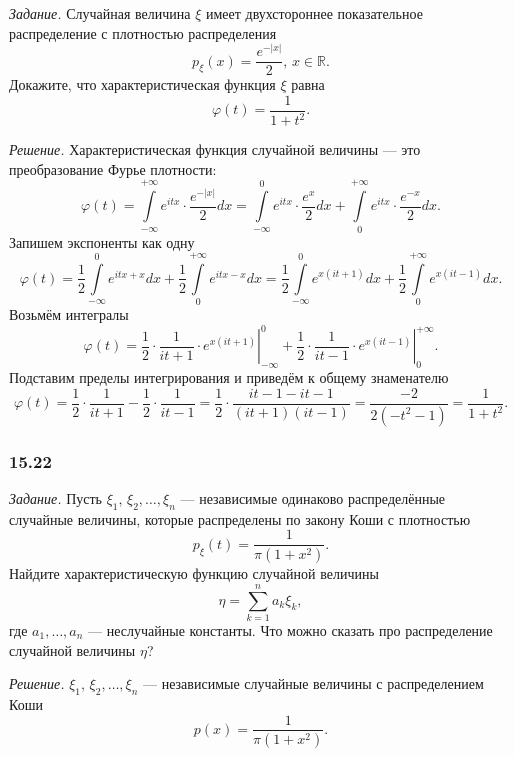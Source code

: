 \textit{Задание.}
Случайная величина $ \xi $
имеет двухстороннее показательное распределение с плотностью распределения
$$p_{ \xi } \left( x \right) =
  \frac{e^{- \left| x \right| }}{2}, \,
  x \in \mathbb{R}.$$
Докажите, что характеристическая функция $ \xi $ равна
$$ \varphi \left( t \right) =
  \frac{1}{1 + t^2}.$$

\textit{Решение.} Характеристическая функция случайной величины --- это преобразование Фурье плотности:
$$ \varphi \left( t \right) =
  \int \limits_{- \infty }^{+ \infty } e^{itx} \cdot \frac{e^{- \left| x \right| }}{2} dx =
  \int \limits_{- \infty }^0 e^{itx} \cdot \frac{e^x}{2} dx +
  \int \limits_0^{+ \infty } e^{itx} \cdot \frac{e^{- x}}{2} dx.$$
Запишем экспоненты как одну
$$ \varphi \left( t \right) =
  \frac{1}{2} \int \limits_{- \infty }^0 e^{itx + x} dx +
  \frac{1}{2} \int \limits_0^{+ \infty } e^{itx - x} dx =
  \frac{1}{2} \int \limits_{- \infty }^0 e^{x \left( it + 1 \right) } dx +
  \frac{1}{2} \int \limits_0^{+ \infty } e^{x \left( it - 1 \right) }dx.$$
Возьмём интегралы
$$ \varphi \left( t \right) =
  \frac{1}{2} \cdot \left. \frac{1}{it + 1} \cdot
  e^{x \left( it + 1 \right) } \right|_{- \infty }^0 +
  \frac{1}{2} \cdot \left. \frac{1}{it - 1} \cdot
  e^{x \left( it - 1 \right) } \right|_0^{+ \infty }.$$
Подставим пределы интегрирования и приведём к общему знаменателю
$$ \varphi \left( t \right) =
  \frac{1}{2} \cdot \frac{1}{it + 1} - \frac{1}{2} \cdot \frac{1}{it - 1} =
  \frac{1}{2} \cdot \frac{it - 1 - it - 1}{ \left( it + 1 \right) \left( it - 1 \right) } =
  \frac{- 2}{2 \left( - t^2 - 1 \right) } =
  \frac{1}{1 + t^2}.$$

\subsubsection*{15.22}

\textit{Задание.}
Пусть $ \xi_1, \, \xi_2, \dotsc, \xi_n$ --- независимые одинаково распределённые случайные величины,
которые распределены по закону Коши с плотностью
$$p_{ \xi } \left( t \right) =
  \frac{1}{ \pi \left( 1 + x^2 \right) }.$$
Найдите характеристическую функцию случайной величины
$$ \eta =
  \sum \limits_{k=1}^n a_k \xi_k,$$
где $a_1, \dotsc, a_n$ --- неслучайные константы.
Что можно сказать про распределение случайной величины $ \eta $?

\textit{Решение.}
$ \xi_1, \, \xi_2, \dotsc, \xi_n$ --- независимые случайные величины с распределением Коши
$$p \left( x \right) =
  \frac{1}{ \pi \left( 1 + x^2 \right) }.$$


